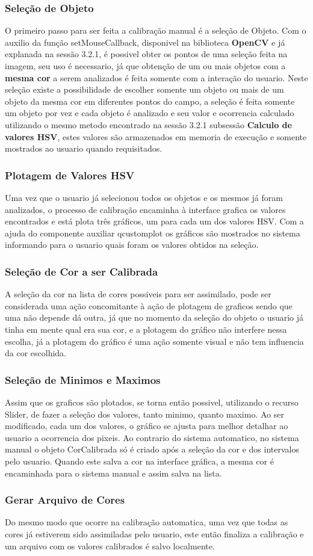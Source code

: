   	\subsubsection{Seleção de Objeto}	
  	O primeiro passo para ser feita a calibração manual é a seleção de Objeto. Com o auxilio da função setMouseCallback, disponivel na biblioteca \textbf{OpenCV} e já explanada na sessão 3.2.1, é possivel obter os pontos de uma seleção feita na imagem, seu uso é necessario, já que obtenção de um ou mais objetos com a \textbf{mesma cor} a serem analizados é feita somente com a interação do usuario. Neste seleção existe a possibilidade de escolher somente um objeto ou mais de um objeto da mesma cor em diferentes pontos do campo, a seleção é feita somente um objeto por vez e cada objeto é analizado e seu valor e ocorrencia calculado utilizando o mesmo metodo encontrado na sessão 3.2.1 subsessão \textbf{Calculo de valores HSV}, estes valores são armazenados em memoria de execução e somente mostrados ao usuario quando requisitados. 
  	
  	\subsubsection{Plotagem de Valores HSV}	
  	Uma vez que o usuario já selecionou todos os objetos e os mesmos já foram analizados, o processo de calibração encaminha à interface grafica os valores encontrados e está plota três gráficos, um para cada um dos valores HSV.
  	Com a ajuda do componente auxiliar qcustomplot os gráficos são mostrados no sistema informando para o usuario quais foram os valores obtidos na seleção.
  	
  	\subsubsection{Seleção de Cor a ser Calibrada}
  	A seleção da cor na lista de cores possiveis para ser assimilado, pode ser considerada uma ação concomitante à ação de plotagem de graficos sendo que uma não depende dá outra, já que no momento da seleção do objeto o usuario já tinha em mente qual era sua cor, e a plotagem do gráfico não interfere nessa escolha, já a plotagem do gráfico é uma ação somente visual e não tem influencia da cor escolhida.
  	
  	\subsubsection{Seleção de Minimos e Maximos}
  	 Assim que os graficos são plotados, se torna então possivel, utilizando o recurso Slider, de fazer a seleção dos valores, tanto minimo, quanto maximo. Ao ser modificado, cada um dos valores, o gráfico se ajusta para melhor detalhar ao usuario a ocorrencia dos pixeis. Ao contrario do sistema automatico, no sistema manual o objeto CorCalibrada só é criado após a seleção da cor e dos intervalos pelo usuario. Quando este salva a cor na interface gráfica, a mesma cor é encaminhada para o sistema manual e assim salva na lista.
  	 
  	 
\subsubsection{Gerar Arquivo de Cores}
Do mesmo modo que ocorre na calibração automatica, uma vez que todas as cores já estiverem sido assimiladas pelo usuario, este então finaliza a calibração e um arquivo com os valores calibrados é salvo localmente.
  	   	
  		
  	